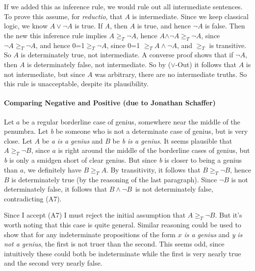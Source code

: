 If we added this as inference rule, we would rule out all intermediate
sentences. To prove this assume, for \emph{reductio}, that \(A\) is
intermediate. Since we keep classical logic, we know \(A \vee \neg A\)
is true. If \emph{A}, then \(A\) is true, and hence \(\neg A\) is false.
Then the new this inference rule implies \(A \geqslant _T \neg A\),
hence \(A\)\({\wedge}{\neg}\)\(A \geqslant _T \neg A\), since
\(\neg A \geqslant _T \neg A\), and hence 0=1\(\geqslant _T \neg A\),
since 0=1 \(\geqslant _T A \wedge \neg A\), and \(\geqslant _T\) is
transitive. So \(A\) is determinately true, not intermediate. A converse
proof shows that if \(\neg A\), then \(A\) is determinately false, not
intermediate. So by (\(\vee\)-Out) it follows that \(A\) is not
intermediate, but since \(A\) was arbitrary, there are no intermediate
truths. So this rule is unacceptable, despite its plausibility.

\hypertarget{comparing-negative-and-positive-due-to-jonathan-schaffer}{%
\paragraph*{Comparing Negative and Positive (due to Jonathan
Schaffer)}\label{comparing-negative-and-positive-due-to-jonathan-schaffer}}

Let \(a\) be a regular borderline case of genius, somewhere near the
middle of the penumbra. Let \emph{b} be someone who is not a determinate
case of genius, but is very close. Let \(A\) be \emph{a is a genius} and
\(B\) be \emph{b is a genius}. It seems plausible that
\(A \geqslant _T \neg B\), since \(a\) is right around the middle of the
borderline cases of genius, but \emph{b} is only a smidgen short of
clear genius. But since \emph{b} is closer to being a genius than \(a\),
we definitely have \(B \geqslant _T A\). By transitivity, it follows
that \(B \geqslant _T \neg B\), hence \(B\) is determinately true (by
the reasoning of the last paragraph). Since \(\neg B\) is not
determinately false, it follows that \(B \wedge \neg B\)~is not
determinately false, contradicting (A7).

Since I accept (A7) I must reject the initial assumption that
\(A \geqslant _T \neg B\). But it's worth noting that this case is quite
general. Similar reasoning could be used to show that for any
indeterminate propositions of the form \(x\) \emph{is a genius} and
\emph{y} \emph{is not a genius}, the first is not truer than the second.
This seems odd, since intuitively these could both be indeterminate
while the first is very nearly true and the second very nearly false.

